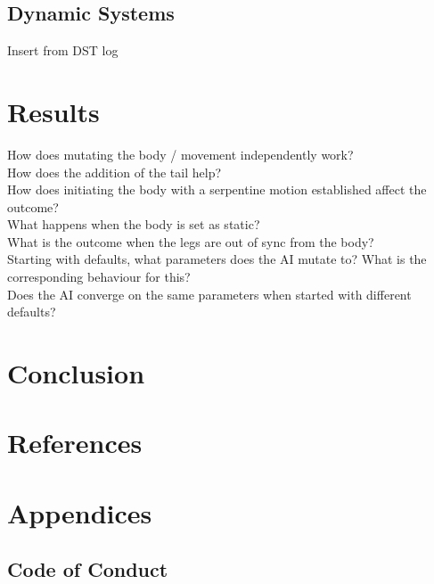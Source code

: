 \documentclass{article}
\begin{document}
\subsection{Dynamic Systems}
Insert from DST log


\newpage
\section{Results}
How does mutating the body / movement independently work?\\
How does the addition of the tail help?\\
How does initiating the body with a serpentine motion established affect the outcome?\\
What happens when the body is set as static?\\
What is the outcome when the legs are out of sync from the body?\\
Starting with defaults, what parameters does the AI mutate to? What is the corresponding behaviour for this?\\
Does the AI converge on the same parameters when started with different defaults?\\



\newpage
\section{Conclusion}

\newpage

\section{References}

\newpage
\section{Appendices}
\subsection{Code of Conduct}
\end{document}
